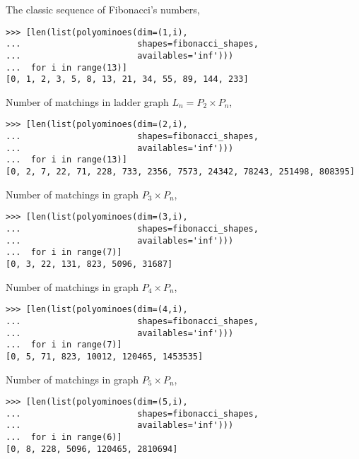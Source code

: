The classic sequence of Fibonacci's numbers, 
\begin{verbatim}
>>> [len(list(polyominoes(dim=(1,i), 
...                       shapes=fibonacci_shapes, 
...                       availables='inf')))
...  for i in range(13)]
[0, 1, 2, 3, 5, 8, 13, 21, 34, 55, 89, 144, 233]
\end{verbatim}
Number of matchings in ladder graph $L_n = P_2 \times P_n$, 
\begin{verbatim}
>>> [len(list(polyominoes(dim=(2,i), 
...                       shapes=fibonacci_shapes, 
...                       availables='inf')))
...  for i in range(13)]
[0, 2, 7, 22, 71, 228, 733, 2356, 7573, 24342, 78243, 251498, 808395]
\end{verbatim}
Number of matchings in graph $P_{3} \times P_{n}$, 
\begin{verbatim}
>>> [len(list(polyominoes(dim=(3,i), 
...                       shapes=fibonacci_shapes, 
...                       availables='inf')))
...  for i in range(7)]
[0, 3, 22, 131, 823, 5096, 31687]
\end{verbatim}
Number of matchings in graph $P_{4} \times P_{n}$, 
\begin{verbatim}
>>> [len(list(polyominoes(dim=(4,i), 
...                       shapes=fibonacci_shapes, 
...                       availables='inf')))
...  for i in range(7)]
[0, 5, 71, 823, 10012, 120465, 1453535]
\end{verbatim}
Number of matchings in graph $P_{5} \times P_{n}$, 
\begin{verbatim}
>>> [len(list(polyominoes(dim=(5,i), 
...                       shapes=fibonacci_shapes, 
...                       availables='inf')))
...  for i in range(6)]
[0, 8, 228, 5096, 120465, 2810694]
\end{verbatim}

\newpage

